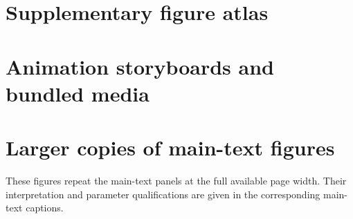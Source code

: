 \clearpage
\section{Supplementary figure atlas}

\clearpage
\section{Animation storyboards and bundled media}

\clearpage
\section{Larger copies of main-text figures}
These figures repeat the main-text panels at the full available page width. Their interpretation and parameter qualifications are given in the corresponding main-text captions.

\clearpage


